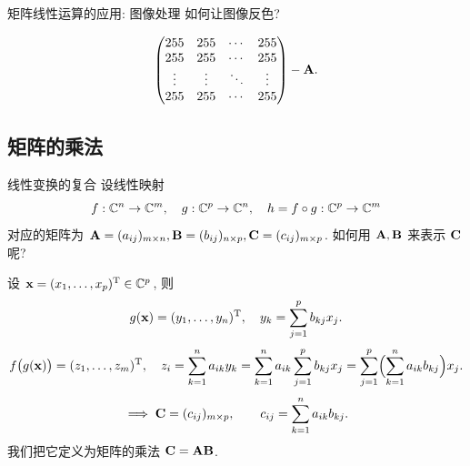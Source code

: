 \begin{frame}{矩阵线性运算的应用: 图像处理}
	\onslide<+->
	如何让图像反色?
	\begin{center}
	\end{center}

	\onslide<+->
	\[\begin{pmatrix}
		255&255&\cdots&255\\
		255&255&\cdots&255\\
		\vdots&\vdots&\ddots&\vdots\\
		255&255&\cdots&255
	\end{pmatrix}-{\mathbf{A}}.\]
\end{frame}

\subsection{矩阵的乘法}


\begin{frame}{线性变换的复合}
	\onslide<+->
	设线性映射
	\[f:{\mathbb{C}}^n\to{\mathbb{C}}^m,\quad
	g:{\mathbb{C}}^p\to {\mathbb{C}}^n,\quad 
	h=f\circ g:{\mathbb{C}}^p\to{\mathbb{C}}^m\]
	对应的矩阵为 ${\mathbf{A}}=(a_{ij})_{m\times n}, {\mathbf{B}}=(b_{ij})_{n\times p},{\mathbf{C}}=(c_{ij})_{m\times p}$.
	\onslide<+->
	如何用 ${\mathbf{A}},{\mathbf{B}}$ 来表示 ${\mathbf{C}}$ 呢?

	\onslide<+->
	设 ${\mathbf{x}}=(x_1,\dots,x_p)^{\mathrm{T}}\in {\mathbb{C}}^p$, 则
	\[g({\mathbf{x}})=(y_1,\dots,y_n)^{\mathrm{T}}, \quad
		y_k=\sum_{j=1}^p b_{kj} x_j.\]
	\onslide<+->
	\[f\bigl(g({\mathbf{x}})\bigr)=(z_1,\dots,z_m)^{\mathrm{T}}, \quad
	z_i=\sum_{k=1}^n a_{ik} y_k=\sum_{k=1}^n a_{ik} \sum_{j=1}^p b_{kj} x_j=\sum_{j=1}^p\Bigl(\sum_{k=1}^n a_{ik}b_{kj}\Bigr)x_j.\]
	\onslide<+->
	\[\implies{\mathbf{C}}=(c_{ij})_{m\times p},\qquad c_{ij}=\sum_{k=1}^n a_{ik}b_{kj}.\]
	\onslide<+->
	我们把它定义为矩阵的乘法 ${\mathbf{C}}={\mathbf{A}}{\mathbf{B}}$.
\end{frame}


